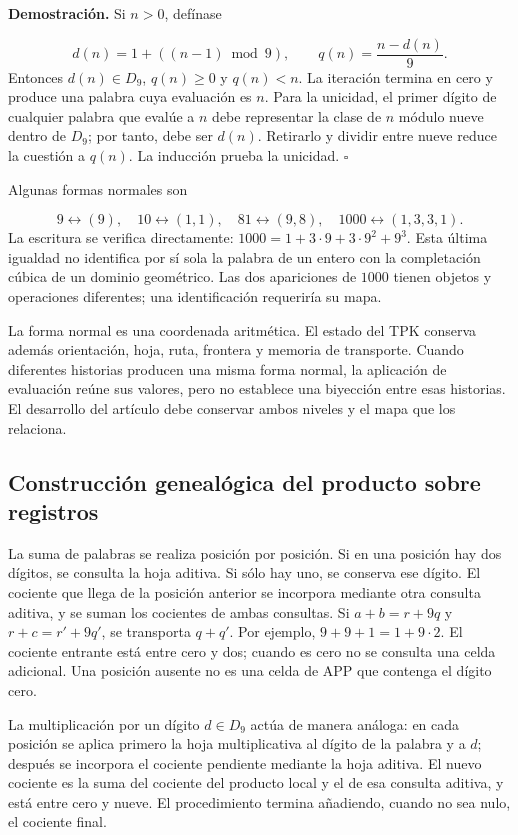 \textbf{Demostración.} Si $n>0$, defínase

\[
d(n)=1+((n-1)\bmod9),\qquad q(n)=\frac{n-d(n)}9.
\]
Entonces $d(n)\in D_9$, $q(n)\ge0$ y $q(n)<n$. La iteración termina en cero y produce una palabra cuya evaluación es $n$. Para la unicidad, el primer dígito de cualquier palabra que evalúe a $n$ debe representar la clase de $n$ módulo nueve dentro de $D_9$; por tanto, debe ser $d(n)$. Retirarlo y dividir entre nueve reduce la cuestión a $q(n)$. La inducción prueba la unicidad. \hfill\(\square\)

Algunas formas normales son

\[
9\leftrightarrow(9),\quad
10\leftrightarrow(1,1),\quad
81\leftrightarrow(9,8),\quad
1000\leftrightarrow(1,3,3,1).
\]
La escritura se verifica directamente: $1000=1+3\cdot9+3\cdot9^2+9^3$. Esta última igualdad no identifica por sí sola la palabra de un entero con la completación cúbica de un dominio geométrico. Las dos apariciones de $1000$ tienen objetos y operaciones diferentes; una identificación requeriría su mapa.

La forma normal es una coordenada aritmética. El estado del TPK conserva además orientación, hoja, ruta, frontera y memoria de transporte. Cuando diferentes historias producen una misma forma normal, la aplicación de evaluación reúne sus valores, pero no establece una biyección entre esas historias. El desarrollo del artículo debe conservar ambos niveles y el mapa que los relaciona.

\subsection{Construcción genealógica del producto sobre registros}
La suma de palabras se realiza posición por posición. Si en una posición hay dos dígitos, se consulta la hoja aditiva. Si sólo hay uno, se conserva ese dígito. El cociente que llega de la posición anterior se incorpora mediante otra consulta aditiva, y se suman los cocientes de ambas consultas. Si \(a+b=r+9q\) y \(r+c=r'+9q'\), se transporta \(q+q'\). Por ejemplo, \(9+9+1=1+9\cdot2\). El cociente entrante está entre cero y dos; cuando es cero no se consulta una celda adicional. Una posición ausente no es una celda de APP que contenga el dígito cero.

La multiplicación por un dígito $d\in D_9$ actúa de manera análoga: en cada posición se aplica primero la hoja multiplicativa al dígito de la palabra y a $d$; después se incorpora el cociente pendiente mediante la hoja aditiva. El nuevo cociente es la suma del cociente del producto local y el de esa consulta aditiva, y está entre cero y nueve. El procedimiento termina añadiendo, cuando no sea nulo, el cociente final.

